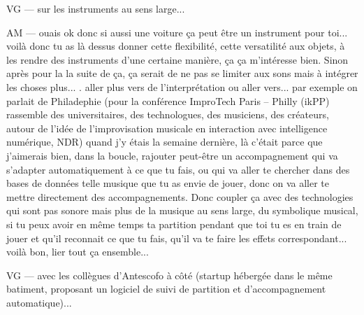 VG — sur les instruments au sens large... 

AM — ouais ok donc si aussi une voiture ça peut être un instrument pour toi... voilà donc tu as là dessus donner cette flexibilité, cette versatilité aux objets, à les rendre des instruments d'une certaine manière, ça ça m'intéresse bien. Sinon après pour la la suite de ça, ça serait de ne pas se limiter aux sons mais à intégrer les choses plus... . aller plus vers de l'interprétation ou aller vers... par exemple on parlait de Philadephie (pour la conférence ImproTech Paris – Philly (ikPP) rassemble des universitaires, des technologues, des musiciens, des créateurs, autour de l’idée de l’improvisation musicale en interaction avec intelligence numérique, NDR) quand j'y étais la semaine dernière, là c'était parce que j'aimerais bien, dans la boucle, rajouter peut-être un accompagnement qui va s'adapter automatiquement à ce que tu fais, ou qui va aller te chercher dans des bases de données telle musique que tu as envie de jouer, donc on va aller te mettre directement des accompagnements. Donc coupler  ça avec des technologies qui sont pas sonore mais plus de la musique au sens large, du symbolique musical, si tu peux avoir en même temps ta partition pendant que toi tu es en train de jouer et qu'il reconnait ce que tu fais, qu'il va te faire les effets correspondant... voilà bon, lier tout ça ensemble... 

VG — avec les collègues d'Antescofo à côté (startup hébergée dans le même batiment, proposant un logiciel de suivi de partition et d'accompagnement automatique)... 

